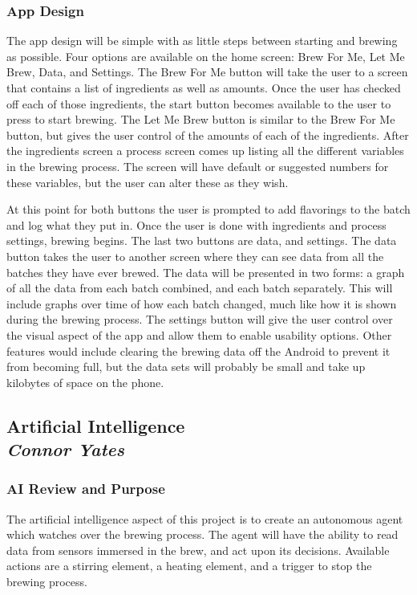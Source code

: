 \documentclass[draftclsnofoot,onecolumn,letterpaper,10pt]{IEEEtran}
\begin{document}
\subsubsection{App Design}
The app design will be simple with as little steps between starting and brewing as possible.
Four options are available on the home screen: Brew For Me, Let Me Brew, Data, and Settings.
The Brew For Me button will take the user to a screen that contains a list of ingredients as well as amounts.
Once the user has checked off each of those ingredients, the start button becomes available to the user to press to start brewing.
The Let Me Brew button is similar to the Brew For Me button, but gives the user control of the amounts of each of the ingredients.
After the ingredients screen a process screen comes up listing all the different variables in the brewing process.
The screen will have default or suggested numbers for these variables, but the user can alter these as they wish.


At this point for both buttons the user is prompted to add flavorings to the batch and log what they put in.
Once the user is done with ingredients and process settings, brewing begins.
The last two buttons are data, and settings. The data button takes the user to another screen where they can see data from all the batches they have ever brewed.
The data will be presented in two forms: a graph of all the data from each batch combined, and each batch separately.
This will include graphs over time of how each batch changed, much like how it is shown during the brewing process.
The settings button will give the user control over the visual aspect of the app and allow them to enable usability options.
Other features would include clearing the brewing data off the Android to prevent it from becoming full, but the data sets will probably be small and take up kilobytes of space on the phone.


\subsection{Artificial Intelligence\\{\em\textbf{Connor Yates}}}
\subsubsection{AI Review and Purpose}
The artificial intelligence aspect of this project is to create an autonomous agent which watches over the brewing process.
The agent will have the ability to read data from sensors immersed in the brew, and act upon its decisions.
Available actions are a stirring element, a heating element, and a trigger to stop the brewing process.
\end{document}
